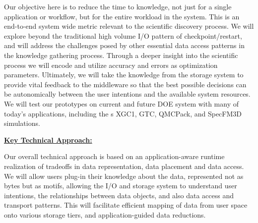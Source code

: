 \documentclass[11pt,letterpaper]{article}
\newcommand{\TODO}[1]{\textcolor{red}{ TO DO: #1 }}
\newcommand{\TODO}[1]{}
\begin{document}
  \setlength{\parindent}{0.5cm}



%
Our objective here is to reduce the time to knowledge, not just for a single
application or workflow, but for the entire workload in the system. This is
an end-to-end system wide metric relevant to the scientific discovery
process. We will explore beyond the traditional high volume I/O pattern of
checkpoint/restart, and will address the challenges posed by other essential
data access patterns in the knowledge gathering process.  Through a deeper
insight into the scientific process we will encode and utilize accuracy and
errors as optimization parameters. 
Ultimately, we will take the knowledge from the storage system to provide vital feedback to the middleware 
so that the best possible decisions can be autonomically  between the user intentions and
the available system resources.  
We will test our prototypes  on current and future DOE system with many of today's applications, including the
s XGC1, GTC, QMCPack, and SpecFM3D simulations. 







%  
% 


\underline{\textbf{Key Technical Approach:}}

Our overall technical approach is based on an application-aware runtime
realization of tradeoffs in data representation, data placement and data
access. We will allow users plug-in their knowledge 
about the data, represented not as bytes but as motifs, allowing the I/O and 
storage system to understand user
intentions, the relationships between data objects, and also data access
and transport patterns. This will facilitate efficient mapping of data from
user space onto various storage tiers, and application-guided
data reductions.
\end{document}
